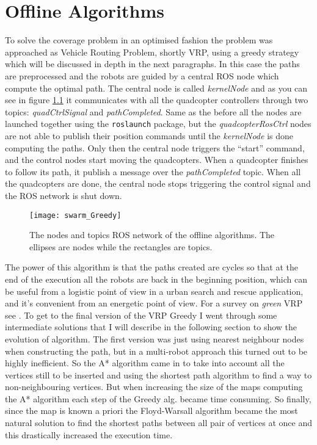 \chapter{Offline Algorithms}

To solve the coverage problem in an optimised fashion the problem was approached as Vehicle Routing Problem, shortly VRP, using a greedy strategy which will be discussed in depth in the next paragraphs. In this case the paths are preprocessed and the robots are guided by a central ROS node which compute the optimal path. The central node is called \emph{kernelNode} and as you can see in figure \ref{fig:nonrt_nodes} it communicates with all the quadcopter controllers through two topics: \emph{quadCtrlSignal} and \emph{pathCompleted}. Same as the before all the nodes are launched together using the \texttt{roslaunch} package, but the \emph{quadcopterRosCtrl} nodes are not able to publish their position commands until the \emph{kernelNode} is done computing the paths. Only then the central node triggers the ``start'' command, and the control nodes start moving the quadcopters. When a quadcopter finishes to follow its path, it publish a message over the \emph{pathCompleted} topic. When all the quadcopters are done, the central node stops triggering the control signal and the ROS network is shut down.


\begin{figure}[h]
\centering
\texttt{[image: swarm\_Greedy]}
\caption[ROS network for the offline algorithms]{The nodes and topics ROS network of the offline algorithms. The ellipses are nodes while the rectangles are topics.}
\label{fig:nonrt_nodes}
\end{figure}

The power of this algorithm is that the paths created are cycles so that at the end of the execution all the robots are back in the beginning position, which can be useful from a logistic point of view in a urban search and rescue application, and it's convenient from an energetic point of view. For a survey on \textit{green} VRP see \cite{greenVRP}. To get to the final version of the VRP Greedy I went through some intermediate solutions that I will describe in the following section to show the evolution of algorithm. The first version was just using nearest neighbour nodes when constructing the path, but in a multi-robot approach this turned out to be highly inefficient. So the A* algorithm came in to take into account all the vertices still to be inserted and using the shortest path algorithm to find a way to non-neighbouring vertices. But when increasing the size of the maps computing the A* algorithm each step of the Greedy alg. became time consuming. So finally, since the map is known a priori the Floyd-Warsall algorithm became the most natural solution to find the shortest paths between all pair of vertices at once and this drastically increased the execution time.


